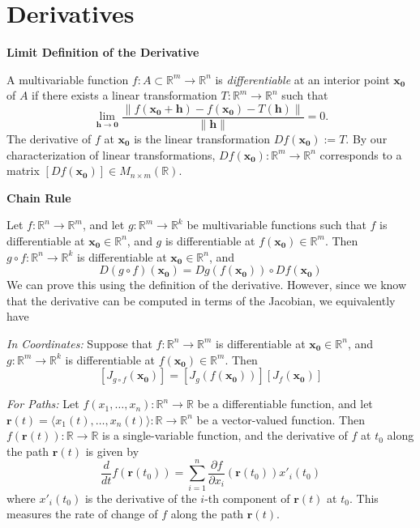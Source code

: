 \documentclass{article}
\begin{document}
\vspace{1cm}

\section*{Derivatives}

\noindent \textbf{Limit Definition of the Derivative}

A multivariable function \( f : A \subset \mathbb{R}^m \rightarrow \mathbb{R}^n \) is \textit{differentiable} at an interior point \( \bm{x_0} \) of \( A \) if there exists a linear transformation \( T : \mathbb{R}^m \rightarrow \mathbb{R}^n \) such that
\[\lim_{\bm{h} \to \bm{0}} \frac{\|f(\bm{x_0} + \bm{h}) - f(\bm{x_0}) - T(\bm{h})\|}{\|\bm{h}\|} = 0.\]
The derivative of \( f \) at \( \bm{x_0} \) is the linear transformation \( Df(\bm{x_0}) := T \). By our characterization of linear transformations, \( Df(\bm{x_0}) : \mathbb{R}^m \rightarrow \mathbb{R}^n \) corresponds to a matrix \([Df(\bm{x_0})] \in M_{n \times m}(\mathbb{R})\).

\vspace{0.5cm}

\noindent \textbf{Chain Rule}

Let \( f : \mathbb{R}^n \rightarrow \mathbb{R}^m \), and let \( g : \mathbb{R}^m \rightarrow \mathbb{R}^k \) be multivariable functions such that \( f \) is differentiable at \( \bm{x_0} \in \mathbb{R}^n \), and \( g \) is differentiable at \( f(\bm{x_0}) \in \mathbb{R}^m \). Then \( g \circ f : \mathbb{R}^n \rightarrow \mathbb{R}^k \) is differentiable at \( \bm{x_0} \in \mathbb{R}^n \), and
\[ D(g \circ f)(\bm{x_0}) = Dg(f(\bm{x_0})) \circ Df(\bm{x_0}) \]
We can prove this using the definition of the derivative. However, since we know that the derivative can be computed in terms of the Jacobian, we equivalently have

\vspace{0.25cm}

\textit{In Coordinates: } Suppose that \( f : \mathbb{R}^n \rightarrow \mathbb{R}^m \) is differentiable at \( \bm{x_0} \in \mathbb{R}^n \), and \( g : \mathbb{R}^m \rightarrow \mathbb{R}^k \) is differentiable at \( f(\bm{x_0}) \in \mathbb{R}^m \). Then
\[ [J_{g \circ f} (\bm{x_0})] = [J_g(f(\bm{x_0}))] [J_f (\bm{x_0})] \]

\vspace{0.25cm}

\textit{For Paths:} Let \( f(x_1, \ldots, x_n) : \mathbb{R}^n \rightarrow \mathbb{R} \) be a differentiable function, and let \( \bm{r}(t) = \langle x_1(t), \ldots, x_n(t) \rangle : \mathbb{R} \rightarrow \mathbb{R}^n \) be a vector-valued function. Then \( f(\bm{r}(t)) : \mathbb{R} \rightarrow \mathbb{R} \) is a single-variable function, and the derivative of \( f \) at \( t_0 \) along the path \( \bm{r}(t) \) is given by
\[
\frac{d}{dt} f(\bm{r}(t_0)) = \sum_{i=1}^{n} \frac{\partial f}{\partial x_i}(\bm{r}(t_0)) x'_i(t_0)
\]
where \( x'_i(t_0) \) is the derivative of the \( i \)-th component of \( \bm{r}(t) \) at \( t_0 \). This measures the rate of change of \( f \) along the path \( \bm{r}(t) \).
\end{document}
